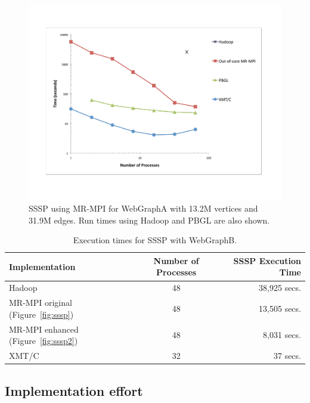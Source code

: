 \begin{figure}[htb]
\includegraphics[width=\textwidth]{fig_ssspA.pdf}
\caption{SSSP using MR-MPI for WebGraphA with 13.2M vertices and 31.9M
  edges.  Run times using Hadoop and PBGL are also shown.}
\label{f:ssspA}
\end{figure}

\begin{table}
\begin{center}
\begin{tabular}{|l|c|r|}
\hline
Implementation & Number of Processes & SSSP Execution Time \\
\hline
Hadoop & 48  & 38,925 secs.\\
MR-MPI original (Figure~\ref{fig:sssp}) & 48 &  13,505 secs.\\
MR-MPI enhanced (Figure~\ref{fig:sssp2}) & 48 &  8,031 secs.\\
XMT/C  & 32 &  37 secs.\\
\hline
\end{tabular}
\caption{Execution times for SSSP with {WebGraphB}.}
\label{t:ssspB}
\end{center}
\end{table}

\subsection{Implementation effort}

